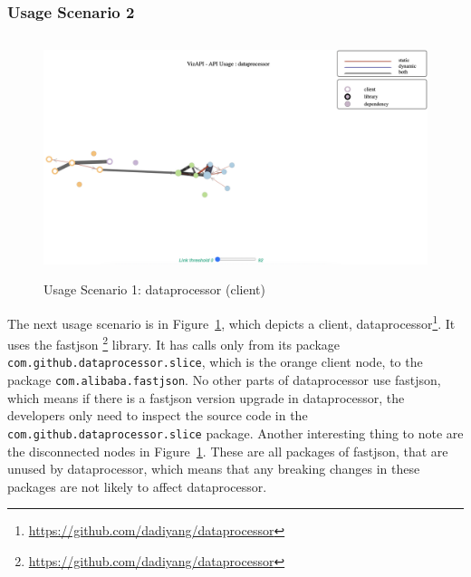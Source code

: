 \subsubsection{Usage Scenario 2}
\begin{figure}[h]
\begin{center}
\includegraphics[scale=1,width=13cm,height=7cm]{images/usage-scenario2.png}
\caption{Usage Scenario 1: dataprocessor (client)}
\label{fig:usagescenario2}
\end{center}
\end{figure}

The next usage scenario is in Figure~\ref{fig:usagescenario2}, which depicts a client, dataprocessor\footnote{\url{https://github.com/dadiyang/dataprocessor}\label{dataprocessor}}. It uses the fastjson \footnote{\url{https://github.com/dadiyang/dataprocessor}\label{dataprocessor}} library. It has calls only from its package \texttt{com.github.dataprocessor.slice}, which is the orange client node, to the package \texttt{com.alibaba.fastjson}. No other parts of dataprocessor use fastjson, which means if there is a fastjson version upgrade in dataprocessor, the developers only need to inspect the source code in the \texttt{com.github.dataprocessor.slice} package. Another interesting thing to note are the disconnected nodes in Figure~\ref{fig:usagescenario2}. These are all packages of fastjson, that are unused by dataprocessor, which means that any breaking changes in these packages are not likely to affect dataprocessor.